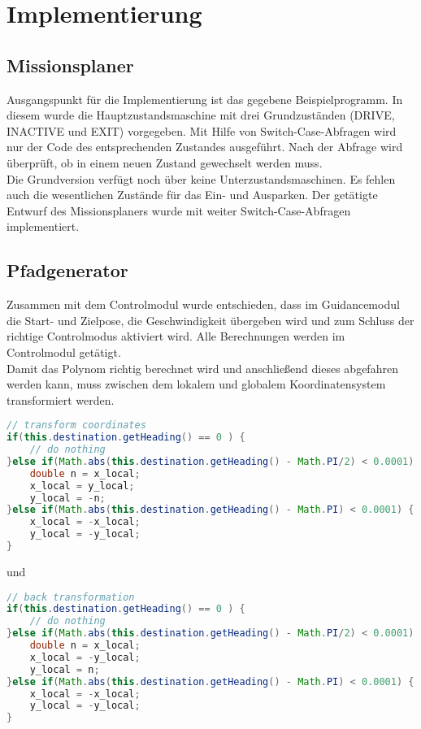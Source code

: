 \chapter{Implementierung}

\section{Missionsplaner}
Ausgangspunkt für die Implementierung ist das gegebene Beispielprogramm. In diesem wurde die Hauptzustandsmaschine mit drei Grundzuständen (DRIVE, INACTIVE und EXIT) vorgegeben. Mit Hilfe von Switch-Case-Abfragen wird nur der Code des entsprechenden Zustandes ausgeführt. Nach der Abfrage wird überprüft, ob in einem neuen Zustand gewechselt werden muss.\\


\noindent Die Grundversion verfügt noch über keine Unterzustandsmaschinen. Es fehlen auch die wesentlichen Zustände für das Ein- und Ausparken. Der getätigte Entwurf des Missionsplaners wurde mit weiter Switch-Case-Abfragen implementiert.

\section{Pfadgenerator}

Zusammen mit dem Controlmodul wurde entschieden, dass im Guidancemodul die Start- und Zielpose, die Geschwindigkeit übergeben wird und zum Schluss der richtige Controlmodus aktiviert wird. Alle Berechnungen werden im Controlmodul getätigt.\\


Damit das Polynom richtig berechnet wird und anschließend dieses abgefahren werden kann, muss zwischen dem lokalem und globalem Koordinatensystem transformiert werden.

\newpage

\begin{lstlisting}[language=java, frame=single]
// transform coordinates
if(this.destination.getHeading() == 0 ) {
	// do nothing
}else if(Math.abs(this.destination.getHeading() - Math.PI/2) < 0.0001) {
	double n = x_local;
	x_local = y_local;
	y_local = -n;
}else if(Math.abs(this.destination.getHeading() - Math.PI) < 0.0001) {
	x_local = -x_local;
	y_local = -y_local;
}
\end{lstlisting}

\noindent und
 
\begin{lstlisting}[language=java, frame=single]
// back transformation
if(this.destination.getHeading() == 0 ) {
	// do nothing
}else if(Math.abs(this.destination.getHeading() - Math.PI/2) < 0.0001) {
	double n = x_local;
	x_local = -y_local;
	y_local = n;
}else if(Math.abs(this.destination.getHeading() - Math.PI) < 0.0001) {
	x_local = -x_local;
	y_local = -y_local;
}
\end{lstlisting}